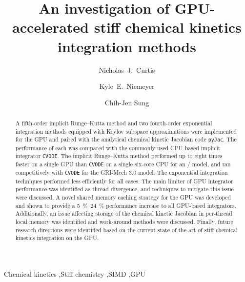 \documentclass[preprint]{elsarticle}
\begin{document}
\begin{frontmatter}

\title{An investigation of GPU-accelerated stiff chemical kinetics integration methods}

\author[uconn]{Nicholas~J.\ Curtis}
\author[osu]{Kyle~E.\ Niemeyer}
\author[uconn]{Chih-Jen Sung}

\address[uconn]{Department of Mechanical Engineering\\
  University of Connecticut, Storrs, CT, 06269, USA}
\address[osu]{School of Mechanical, Industrial, and Manufacturing Engineering\\
  Oregon State University, Corvallis, OR 97331, USA}
  

\begin{abstract}
A fifth-order implicit Runge--Kutta method and two fourth-order exponential integration methods equipped with Krylov subspace approximations were implemented for the GPU and paired with the analytical chemical kinetic Jacobian code \texttt{pyJac}.
The performance of each was compared with the commonly used CPU-based implicit integrator \texttt{CVODE}.
The implicit Runge--Kutta method performed up to eight times faster on a single GPU than \texttt{CVODE} on a single six-core CPU for an \slash {} model, and ran competitively with \texttt{CVODE} for the GRI-Mech 3.0 model.
The exponential integration techniques performed less efficiently for all cases.
The main limiter of GPU integrator performance was identified as thread divergence, and techniques to mitigate this issue were discussed.
A novel shared memory caching strategy for the GPU was developed and shown to provide a \SIrange{5}{24}{\percent} performance increase to all GPU-based integrators.
Additionally, an issue affecting storage of the chemical kinetic Jacobian in per-thread local memory was identified and work-around methods were discussed.
Finally, future research directions were identified based on the current state-of-the-art of stiff chemical kinetics integration on the GPU.
\end{abstract}

\begin{keyword}
 Chemical kinetics \sep Stiff chemistry \sep SIMD \sep GPU
\end{keyword}

\end{frontmatter}
\end{document}
